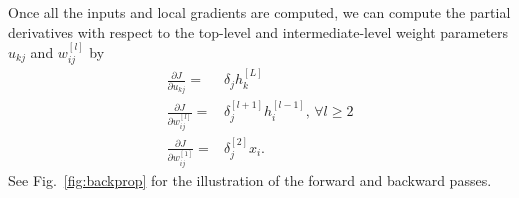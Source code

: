 \documentclass{now}
\newcommand{\qlay}[1]{\left[#1\right]}
\begin{document}
Once all the inputs and local gradients are computed, we can
compute the
partial derivatives with respect to the
top-level and intermediate-level weight parameters $u_{kj}$
and $w_{ij}^{\qlay{l}}$ 
by
\begin{align*}
    \frac{\partial J}{\partial u_{kj}} =& \delta_j
    h_k^{\qlay{L}}
    \nonumber \\
    \frac{\partial J}{\partial w_{ij}^{\qlay{l}}} =&
    \delta_j^{\qlay{l+1}} h_i^{\qlay{l-1}} \text{, }\forall l \geq 2 
    \nonumber \\
    \frac{\partial J}{\partial w_{ij}^{\qlay{1}}} =&
    \delta_j^{\qlay{2}} x_i.
\end{align*}
See Fig.~\ref{fig:backprop}
for the illustration of the forward and backward passes.
\end{document}

